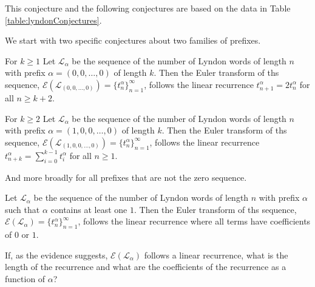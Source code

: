 This conjecture and the following conjectures are based on the data
in Table \ref{table:lyndonConjectures}.

We start with two specific conjectures about two families of prefixes.
\begin{conjecture}
  For $k \geq 1$
  Let $\mathcal{L}_\alpha$ be the sequence of the
  number of Lyndon words of length $n$ with prefix
  ${\alpha = (0, 0, \dots, 0)}$ of length $k$.
  Then the Euler transform of ths sequence,
  $\mathcal{E}(\mathcal{L_{(0, 0, \dots, 0)}}) = \{t_{n}^\alpha\}_{n=1}^\infty$,
  follows the linear recurrence $t_{n+1}^\alpha = 2t_{n}^\alpha$ for all
  $n \geq k + 2$.
\end{conjecture}

\begin{conjecture}
  For $k \geq 2$
  Let $\mathcal{L}_\alpha$ be the sequence of the
  number of Lyndon words of length $n$ with prefix
  ${\alpha = (1, 0, 0, \dots, 0)}$ of length $k$.
  Then the Euler transform of ths sequence,
  $\mathcal{E}(\mathcal{L_{(1, 0, 0, \dots, 0)}}) = \{t_{n}^\alpha\}_{n=1}^\infty$,
  follows the linear recurrence $t_{n+k}^\alpha = \sum_{i=0}^{k-1} t_{i}^\alpha$
  for all $n \geq 1$.
\end{conjecture}

And more broadly for all prefixes that are not the zero sequence.
\begin{conjecture}
  Let $\mathcal{L}_\alpha$ be the sequence of the
  number of Lyndon words of length $n$ with prefix $\alpha$ such that $\alpha$
  contains at least one $1$.
  Then the Euler transform of ths sequence,
  $\mathcal{E}(\mathcal{L_\alpha}) = \{t_{n}^\alpha\}_{n=1}^\infty$,
  follows the linear recurrence where all terms have coefficients of $0$ or $1$.
\end{conjecture}

\begin{openquestion}
  If, as the evidence suggests, $\mathcal{E}(\mathcal{L_\alpha})$ follows a
  linear recurrence,
  what is the length of the recurrence and
  what are the coefficients of the recurrence
  as a function of $\alpha$?
\end{openquestion}




